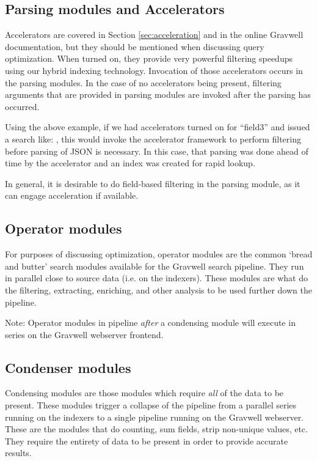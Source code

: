 \subsection{Parsing modules and Accelerators}

Accelerators are covered in Section \ref{sec:acceleration} and in the online
Gravwell documentation, but they should be mentioned when discussing query optimization.
When turned on, they provide very powerful filtering speedups using our hybrid
indexing technology. Invocation of those accelerators occurs in the
parsing modules. In the case of no accelerators being present, filtering
arguments that are provided in parsing modules are invoked after the
parsing has occurred.

Using the above example, if we had accelerators turned on for ``field3''
and issued a search like: , this would invoke the
accelerator framework to perform filtering before parsing of JSON is
necessary. In this case, that parsing was done ahead of time by the
accelerator and an index was created for rapid lookup.

In general, it is desirable to do field-based filtering in the parsing
module, as it can engage acceleration if available.

\subsection{Operator modules}

For purposes of discussing optimization, operator modules are the
common `bread and butter' search modules available for the Gravwell
search pipeline. They run in parallel close to source data (i.e. on
the indexers). These modules are what do the filtering, extracting,
enriching, and other analysis to be used further down the pipeline.

Note: Operator modules in pipeline \emph{after} a condensing module will
execute in series on the Gravwell webserver frontend.

\subsection{Condenser modules}

Condensing modules are those modules which require \emph{all} of the data to
be present. These modules trigger a collapse of the pipeline from a
parallel series running on the indexers to a single pipeline running on
the Gravwell webserver. These are the modules that do counting, sum
fields, strip non-unique values, etc. They require the entirety of data
to be present in order to provide accurate results.

